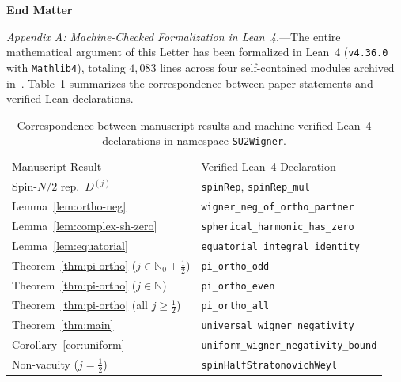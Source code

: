\documentclass[aps,prl,reprint,amsmath,amssymb,nofootinbib,floatfix]{revtex4-2}
\begin{document}
\onecolumngrid
\vspace{12pt}
\begin{center}
\textbf{\large End Matter}
\end{center}
\vspace{4pt}
\twocolumngrid

\emph{Appendix A: Machine-Checked Formalization in Lean~4.}---The entire mathematical argument of this Letter has been formalized in Lean~4 ({\footnotesize\texttt{v4.36.0}} with {\footnotesize\texttt{Mathlib4}}), totaling $4{,}083$ lines across four self-contained modules archived in~\cite{Wang2026Zenodo}. Table~\ref{tab:lean-map} summarizes the correspondence between paper statements and verified Lean declarations.

\begin{table}[h]
\caption{\label{tab:lean-map}Correspondence between manuscript results and machine-verified Lean~4 declarations in namespace {\footnotesize\texttt{SU2Wigner}}.}
\footnotesize
\begin{ruledtabular}
\begin{tabular}{ll}
Manuscript Result & Verified Lean~4 Declaration \\
\colrule
Spin-$N/2$ rep.\ $D^{(j)}$ & \texttt{spinRep}, \texttt{spinRep\_mul} \\
Lemma~\ref{lem:ortho-neg} & \texttt{wigner\_neg\_of\_ortho\_partner} \\
Lemma~\ref{lem:complex-sh-zero} & \texttt{spherical\_harmonic\_has\_zero} \\
Lemma~\ref{lem:equatorial} & \texttt{equatorial\_integral\_identity} \\
Theorem~\ref{thm:pi-ortho} ($j\in\mathbb{N}_0+\frac{1}{2}$) & \texttt{pi\_ortho\_odd} \\
Theorem~\ref{thm:pi-ortho} ($j\in\mathbb{N}$) & \texttt{pi\_ortho\_even} \\
Theorem~\ref{thm:pi-ortho} (all $j\ge\frac{1}{2}$) & \texttt{pi\_ortho\_all} \\
Theorem~\ref{thm:main} & \texttt{universal\_wigner\_negativity} \\
Corollary~\ref{cor:uniform} & \texttt{uniform\_wigner\_negativity\_bound} \\
Non-vacuity ($j=\frac{1}{2}$) & \texttt{spinHalfStratonovichWeyl} \\
\end{tabular}
\end{ruledtabular}
\end{table}
\end{document}
